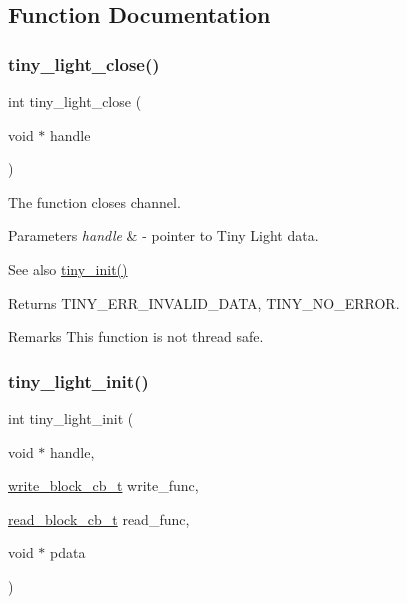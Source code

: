 \subsection{Function Documentation}
\mbox{\label{group__LIGHT__API_ga6e045b8f4ef551c274fbacaa625e2748}} 
\subsubsection{\texorpdfstring{tiny\+\_\+light\+\_\+close()}{tiny\_light\_close()}}
{\footnotesize\ttfamily int tiny\+\_\+light\+\_\+close (\begin{DoxyParamCaption}\item[{void $\ast$}]{handle }\end{DoxyParamCaption})}

The function closes channel. 
\begin{DoxyParams}{Parameters}
{\em handle} & -\/ pointer to Tiny Light data. \\
\hline
\end{DoxyParams}
\begin{DoxySeeAlso}{See also}
\hyperlink{group__SIMPLE__API_gab9bfaed3c75551c8b7f3f8b25e766546}{tiny\+\_\+init()} 
\end{DoxySeeAlso}
\begin{DoxyReturn}{Returns}
T\+I\+N\+Y\+\_\+\+E\+R\+R\+\_\+\+I\+N\+V\+A\+L\+I\+D\+\_\+\+D\+A\+TA, T\+I\+N\+Y\+\_\+\+N\+O\+\_\+\+E\+R\+R\+OR. 
\end{DoxyReturn}
\begin{DoxyRemark}{Remarks}
This function is not thread safe. 
\end{DoxyRemark}
\mbox{\label{group__LIGHT__API_ga221cf790724163d1aee89ad6a6c9a14d}} 
\subsubsection{\texorpdfstring{tiny\+\_\+light\+\_\+init()}{tiny\_light\_init()}}
{\footnotesize\ttfamily int tiny\+\_\+light\+\_\+init (\begin{DoxyParamCaption}\item[{void $\ast$}]{handle,  }\item[{\hyperlink{tiny__proto__types_8h_aafd634660bba76cace57a8f9b01e044d}{write\+\_\+block\+\_\+cb\+\_\+t}}]{write\+\_\+func,  }\item[{\hyperlink{tiny__proto__types_8h_a15bec127d9ee63658563d62e92b5261b}{read\+\_\+block\+\_\+cb\+\_\+t}}]{read\+\_\+func,  }\item[{void $\ast$}]{pdata }\end{DoxyParamCaption})}

